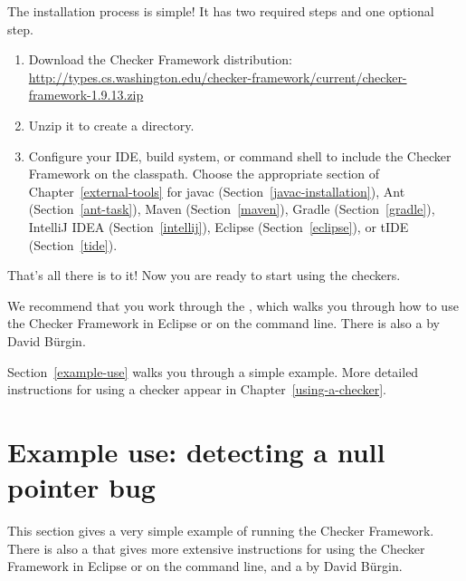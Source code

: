 The installation process is simple!  It has two required steps and one
optional step.
\begin{enumerate}
\item
  Download the Checker Framework distribution:
  \\
  \url{http://types.cs.washington.edu/checker-framework/current/checker-framework-1.9.13.zip}

\item
  Unzip it to create a  directory.

\item
  \label{installation-configure-step}%
  Configure your IDE, build system, or command shell to include the Checker
  Framework on the classpath.  Choose the appropriate section of
  Chapter~\ref{external-tools} for
javac (Section~\ref{javac-installation}),
Ant (Section~\ref{ant-task}),
Maven (Section~\ref{maven}),
Gradle (Section~\ref{gradle}),
IntelliJ IDEA (Section~\ref{intellij}),
Eclipse (Section~\ref{eclipse}),
or
tIDE (Section~\ref{tide}).


\end{enumerate}

That's all there is to it!  Now you are ready to start using the checkers.

We recommend that you work through the
, which walks you through how to use the Checker
Framework in Eclipse or on
the command line.
There is also a
 by David B\"urgin.

Section~\ref{example-use} walks you through a simple example.  More detailed
instructions for using a checker appear in Chapter~\ref{using-a-checker}.



\section{Example use:  detecting a null pointer bug\label{example-use}}

This section gives a very simple example of running the Checker Framework.
There is also a 
that gives more extensive instructions for using the Checker Framework in
Eclipse or on the command line,
and a
 by David B\"urgin.

